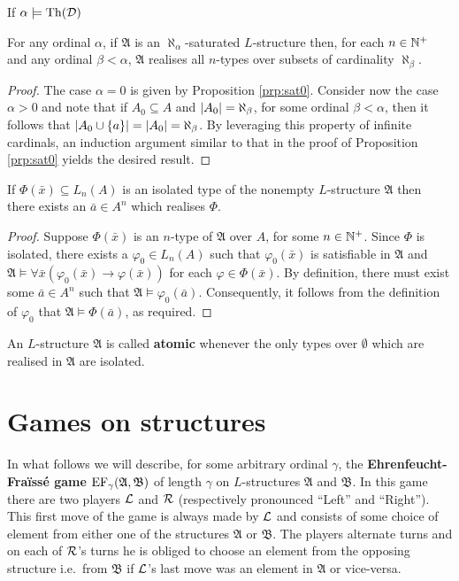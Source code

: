 \begin{prp}
	If $\alpha\models\operatorname{Th}(\mathcal{D})$
\end{prp}

\begin{prp}
	For any ordinal $\alpha$, if $\mathfrak{A}$ is an $\aleph_\alpha$-saturated $L$-structure then, for each $n\in\mathbb{N}^{+}$ and any ordinal $\beta<\alpha$, $\mathfrak{A}$ realises all $n$-types over subsets of cardinality $\aleph_\beta$.
\end{prp}
\begin{proof}
	The case $\alpha=0$ is given by Proposition \ref{prp:sat0}.  Consider now the case $\alpha>0$ and note that if $A_0\subseteq A$ and $\left\lvert A_0\right\rvert=\aleph_\beta$, for some ordinal $\beta<\alpha$, then it follows that $\left\lvert A_0\cup\left\lbrace a\right\rbrace\right\rvert=\left\lvert A_0\right\rvert=\aleph_\beta$.  By leveraging this property of infinite cardinals, an induction argument similar to that in the proof of Proposition \ref{prp:sat0} yields the desired result.
\end{proof}

\begin{prp}
	If $\Phi(\bar{x})\subseteq L_n(A)$ is an isolated type of the nonempty $L$-structure $\mathfrak{A}$ then there exists an $\bar{a}\in A^n$ which realises $\Phi$.
\end{prp}
\begin{proof}
	Suppose $\Phi(\bar{x})$ is an $n$-type of $\mathfrak{A}$ over $A$, for some $n\in\mathbb{N}^{+}$.  Since $\Phi$ is isolated, there exists a $\varphi_0\in L_n(A)$ such that $\varphi_0(\bar{x})$ is satisfiable in $\mathfrak{A}$ and $\mathfrak{A}\models\forall\bar{x}(\varphi_0(\bar{x})\rightarrow\varphi(\bar{x}))$ for each $\varphi\in\Phi(\bar{x})$.  By definition, there must exist some $\bar{a}\in A^n$ such that $\mathfrak{A}\models\varphi_0(\bar{a})$.  Consequently, it follows from the definition of $\varphi_0$ that $\mathfrak{A}\models\Phi(\bar{a})$, as required.
\end{proof}

\begin{dfn}[Atomicity]
	An $L$-structure $\mathfrak{A}$ is called \textbf{atomic} whenever the only types over $\emptyset$ which are realised in $\mathfrak{A}$ are isolated.
\end{dfn}


\section{Games on structures}

In what follows we will describe, for some arbitrary ordinal $\gamma$, the \textbf{Ehrenfeucht-Fra\"iss\'e game} $\operatorname{EF}_\gamma(\mathfrak{A},\mathfrak{B})$ of length $\gamma$ on $L$-structures $\mathfrak{A}$ and $\mathfrak{B}$.  In this game there are two players $\mathcal{L}$ and $\mathcal{R}$ (respectively pronounced ``Left'' and ``Right'').  This first move of the game is always made by $\mathcal{L}$ and consists of some choice of element from either one of the structures $\mathfrak{A}$ or $\mathfrak{B}$.  The players alternate turns and on each of  $\mathcal{R}$'s turns he is obliged to choose an element from the opposing structure i.e.\ from $\mathfrak{B}$ if $\mathcal{L}$'s last move was an element in $\mathfrak{A}$ or vice-versa.

